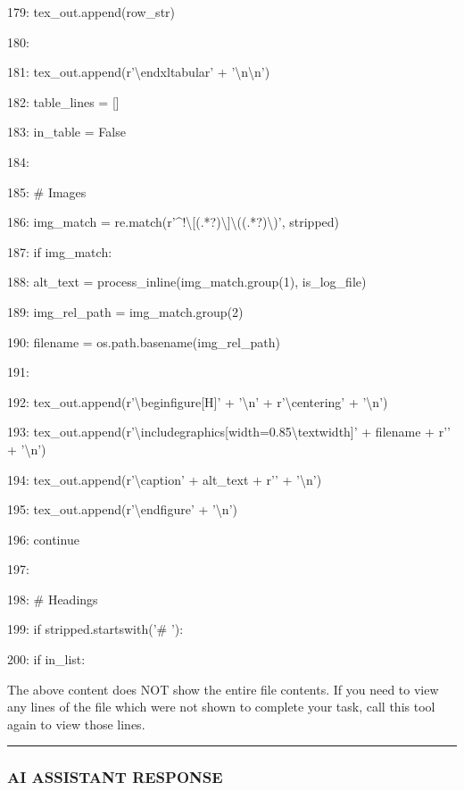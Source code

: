 \documentclass[11pt,a4paper]{article}
\begin{document}
179:                     tex\_out.append(row\_str)

180:

181:                 tex\_out.append(r'\textbackslash{}end{xltabular}' + '\textbackslash{}n\textbackslash{}n')

182:                 table\_lines = []

183:                 in\_table = False

184:

185:         \# Images

186:         img\_match = re.match(r'\textasciicircum{}!\textbackslash{}[(.*?)\textbackslash{}]\textbackslash{}((.*?)\textbackslash{})', stripped)

187:         if img\_match:

188:             alt\_text = process\_inline(img\_match.group(1), is\_log\_file)

189:             img\_rel\_path = img\_match.group(2)

190:             filename = os.path.basename(img\_rel\_path)

191:

192:             tex\_out.append(r'\textbackslash{}begin{figure}[H]' + '\textbackslash{}n' + r'\textbackslash{}centering' + '\textbackslash{}n')

193:             tex\_out.append(r'\textbackslash{}includegraphics[width=0.85\textbackslash{}textwidth]{' + filename + r'}' + '\textbackslash{}n')

194:             tex\_out.append(r'\textbackslash{}caption{' + alt\_text + r'}' + '\textbackslash{}n')

195:             tex\_out.append(r'\textbackslash{}end{figure}' + '\textbackslash{}n')

196:             continue

197:

198:         \# Headings

199:         if stripped.startswith('\# '):

200:             if in\_list:

The above content does NOT show the entire file contents. If you need to view any lines of the file which were not shown to complete your task, call this tool again to view those lines.


\hrule

\subsubsection{AI ASSISTANT RESPONSE}
\end{document}
